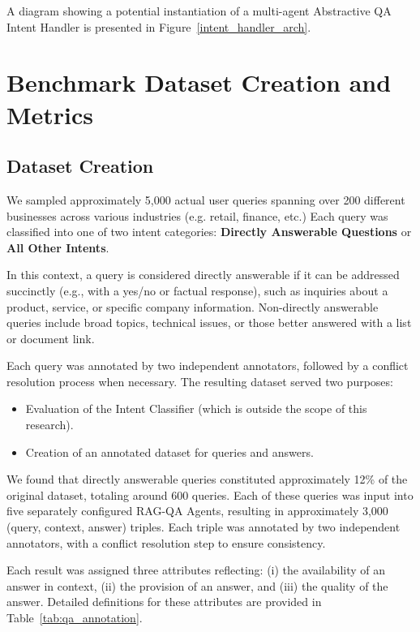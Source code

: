 \documentclass[sigconf,nonacm]{acmart}
\begin{document}
A diagram showing a potential instantiation of a multi-agent Abstractive QA Intent Handler is presented in Figure~\ref{intent_handler_arch}.






\section{Benchmark Dataset Creation and Metrics}

\subsection{Dataset Creation}
We sampled approximately 5,000 actual user queries spanning over 200 different businesses across various industries (e.g. retail, finance, etc.) Each query was classified into one of two intent categories: \textbf{Directly Answerable Questions} or \textbf{All Other Intents}.

In this context, a query is considered directly answerable if it can be addressed succinctly (e.g., with a yes/no or factual response), such as inquiries about a product, service, or specific company information. Non-directly answerable queries include broad topics, technical issues, or those better answered with a list or document link.

Each query was annotated by two independent annotators, followed by a conflict resolution process when necessary. The resulting dataset served two purposes:
\begin{itemize}
\item Evaluation of the Intent Classifier (which is outside the scope of this research).
\item Creation of an annotated dataset for queries and answers.
\end{itemize}

We found that directly answerable queries constituted approximately 12\% of the original dataset, totaling around 600 queries. Each of these queries was input into five separately configured RAG-QA Agents, resulting in approximately 3,000 (query, context, answer) triples. Each triple was annotated by two independent annotators, with a conflict resolution step to ensure consistency.

Each result was assigned three attributes reflecting: (i) the availability of an answer in context, (ii) the provision of an answer, and (iii) the quality of the answer. Detailed definitions for these attributes are provided in Table~\ref{tab:qa_annotation}.
\end{document}
